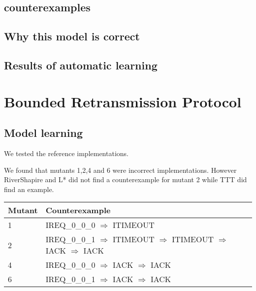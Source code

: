 \documentclass[11pt,a4paper]{article}
\begin{document}
\subsection{counterexamples}

\subsection{Why this model is correct}



\subsection{Results of automatic learning}



\section{Bounded Retransmission Protocol}

\subsection{Model learning}
We tested the reference implementations.

We found that mutants 1,2,4 and 6 were incorrect implementations.
However RiverShapire and L* did not find a counterexample for mutant 2
while TTT did find an example.

\begin{center}
\begin{tabular}{l|l}
\textbf{Mutant} & \textbf{Counterexample}\\
\hline
1 & IREQ\_0\_0\_0 $\Rightarrow$ ITIMEOUT\\
2 & IREQ\_0\_0\_1 $\Rightarrow$ ITIMEOUT $\Rightarrow$ ITIMEOUT $\Rightarrow$ IACK $\Rightarrow$ IACK\\
4 & IREQ\_0\_0\_0 $\Rightarrow$ IACK $\Rightarrow$ IACK\\
6 & IREQ\_0\_0\_1 $\Rightarrow$ IACK $\Rightarrow$ IACK\\
\end{tabular}
\end{center}
\end{document}
